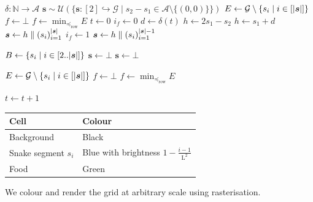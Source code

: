 \documentclass[10pt]{article}
\theoremstyle{definition}
\theoremstyle{remark}
\newcommand{\N}{\mathbb{N}}
\begin{document}
\begin{algorithm}[H]
\caption{$\textsc{Simulate}(\delta)$}
\begin{algorithmic}
	\Require $\delta:\N\to\mathcal{A}$
	\State ${
		\bm{s}
		\sim
		\mathcal{U}(
			\{
				\bm{s}
				:
				[2]
				\hookrightarrow
				\mathcal{G}
				\mid
				s_{2}-s_{1}
				\in
				\mathcal{A}
				\setminus
				\{(0,0)\}
			\}
		)
	}$
	\State ${
		E
		\gets
		\mathcal{G}
		\setminus
		\{
			s_{i}
			\mid
			i\in[\abs{\bm{s}}]
		\}
	}$
		\State $f\gets\mathord{\perp}$
	\Else{}
		\State $f\gets\min_{\preceq_{\mathrm{row}}}E$
	\EndIf
	\State $t\gets 0$
		\State $i_{f}\gets 0$
		\State $d\gets\delta(t)$
			\State $h\gets 2s_{1}-s_{2}$
		\Else{}
			\State $h\gets s_{1}+d$
		\EndIf
			\State ${
				\bm{s}
				\gets
				h
				\parallel
				(s_{i})_{i=1}^{\abs{\bm{s}}}
			}$
			\State $i_{f}\gets 1$
		\Else{}
			\State ${
				\bm{s}
				\gets
				h
				\parallel
				(s_{i})_{i=1}^{\abs{\bm{s}}-1}
			}$
		\EndIf

		\State ${
			B
			\gets
			\{
				s_{i}
				\mid
				i\in[2..\abs{\bm{s}}]
			\}
		}$
			\State $\bm{s}\gets\mathord{\perp}$
		\EndIf
			\State $\bm{s}\gets\mathord{\perp}$
		\EndIf

			\State ${
				E
				\gets
				\mathcal{G}
				\setminus
				\mleft\{
					s_{i}
					\mid
					i\in[\abs{\bm{s}}]
				\mright\}
			}$
				\State $f\gets\mathord{\perp}$
			\Else{}
				\State $f\gets\min_{\preceq_{\mathrm{row}}}E$
			\EndIf
		\EndIf

		\State $t\gets t+1$
	\EndWhile
\end{algorithmic}
\end{algorithm}

\begin{table}[H]
	\centering
	\begin{tabular}{ll}
		\toprule
		\textbf{Cell} & \textbf{Colour} \\
		\midrule
		Background & Black \\
		Snake segment $s_i$ & Blue with brightness $1-\frac{i-1}{\mathrm{L}^2}$ \\
		Food & Green \\
		\bottomrule
	\end{tabular}
\end{table}

We colour and render the grid at arbitrary scale using rasterisation.
\end{document}
